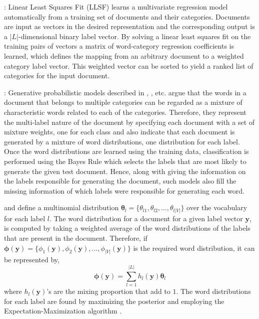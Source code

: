  : Linear Least Squares Fit (LLSF) \citep{yang1992linear} learns a multivariate regression model automatically from a training set of documents and their categories. Documents are input as vectors in the desired representation and the corresponding output is a $|L|$-dimensional binary label vector. By solving a linear least squares fit on the training pairs of vectors a matrix of word-category regression coefficients is learned, which defines the mapping from an arbitrary document to a weighted category label vector. This weighted vector can be sorted to yield a ranked list of categories for the input document.

 : Generative probabilistic models described in \cite{mccallum1999multi}, \cite{nigam1999using}, \cite{ueda2002parametric} etc. argue that the words in a document that belongs to multiple categories can be regarded as a mixture of characteristic words related to each of the categories. Therefore, they represent the multi-label nature of the document by specifying each document with a set of mixture weights, one for each class and also indicate that each document is generated by a mixture of word distributions, one distribution for each label. Once the word distributions are learned using the training data, classification is performed using the Bayes Rule which selects the labels that are most likely to generate the given test document. Hence, along with giving the information on the labels responsible for generating the document, such models also fill the missing information of which labels were responsible for generating each word.

\cite{mccallum1999multi} and \cite{ueda2002parametric} define a multinomial distribution $\boldsymbol{\theta}_{l} = \{\theta_{l1}, \theta_{l2}, \ldots, \theta_{l|V|}\}$ over the vocabulary for each label $l$. The word distribution for a document for a given label vector $\boldsymbol{y}$, is computed by taking a weighted average of the word distributions of the labels that are present in the document. Therefore, if $\boldsymbol{\phi}(\boldsymbol{y}) = \{\phi_{1}(\boldsymbol{y}), \phi_{2}(\boldsymbol{y}), \ldots, \phi_{|V|}(\boldsymbol{y})\}$ is the required word distribution, it can be represented by, 
\begin{equation}
\boldsymbol{\phi}(\boldsymbol{y}) = \sum_{l=1}^{|L|} h_{l}(\boldsymbol{y})\boldsymbol{\theta}_{l}
\end{equation}
where $h_{l}(\boldsymbol{y})$'s are the mixing proportion that add to $1$. The word distributions for each label are found by maximizing the posterior \citep{ueda2002parametric} and employing the Expectation-Maximization algorithm \citep{mccallum1999multi}.

